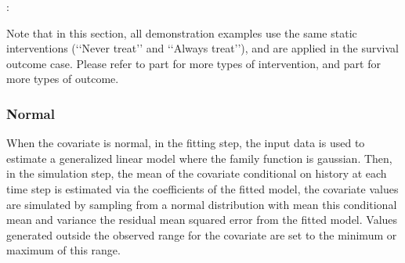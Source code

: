 \documentclass[letterpaper,10pt,english]{sphinxmanual}
\begin{document}
\begin{sphinxVerbatim}[commandchars=\\\{\}]
        
         
      \PYG{p}{[} \PYG{p}{]}
      \PYG{p}{[} \PYG{p}{]}
       
      
\end{sphinxVerbatim}

\sphinxAtStartPar
{}:
\begin{quote}

\end{quote}

\sphinxAtStartPar
Note that in this section, all demonstration examples use the same static interventions
(‘‘Never treat’’ and ‘‘Always treat’’), and are applied in the survival outcome case.
Please refer to {\hyperref[\detokenize{Specifications/Intervention::doc}]{}} part for more types of intervention,
and {\hyperref[\detokenize{Specifications/Outcome model::doc}]{}} part for more types of outcome.


\subsubsection{Normal}
\label{\detokenize{Specifications/Covariate model:normal}}
\sphinxAtStartPar
When the covariate is normal, in the fitting step, the input data is used to estimate a generalized linear model where
the family function is gaussian. Then, in the simulation step, the mean of the covariate conditional on history
at each time step is estimated via the coefficients of the fitted model, the covariate values are simulated
by sampling from a normal distribution with mean this conditional mean and variance the residual mean squared error
from the fitted model. Values generated outside the observed range for the covariate are set to the minimum or maximum of this range.
\end{document}
